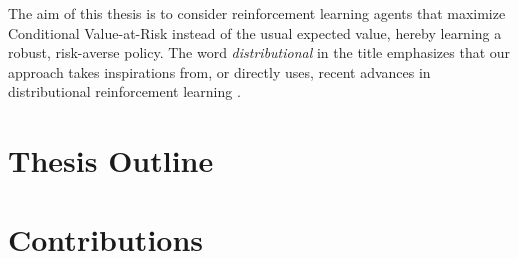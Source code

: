 The aim of this thesis is to consider reinforcement learning agents that maximize Conditional Value-at-Risk instead of the usual expected value, hereby learning a robust, risk-averse policy. The word \textit{distributional} in the title emphasizes that our approach takes inspirations from, or directly uses, recent advances in distributional reinforcement learning \cite{bellemare2017distributional}.



\section{Thesis Outline}






\section{Contributions}




